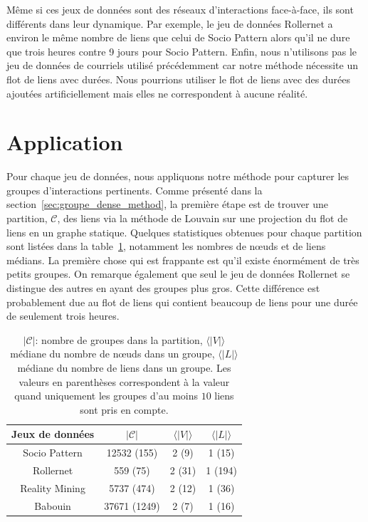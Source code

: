 Même si ces jeux de données sont des réseaux d'interactions face-à-face, ils sont différents dans leur dynamique.
Par exemple, le jeu de données Rollernet a environ le même nombre de liens que celui de Socio Pattern alors qu'il ne dure que trois heures contre 9 jours pour Socio Pattern.
Enfin, nous n'utilisons pas le jeu de données de courriels utilisé précédemment car notre méthode nécessite un flot de liens avec durées.
Nous pourrions utiliser le flot de liens avec des durées ajoutées artificiellement mais elles ne correspondent à aucune réalité.



\section{Application}
\label{sec:groupe_dense_result}

Pour chaque jeu de données, nous appliquons notre méthode pour capturer les groupes d'interactions pertinents.
Comme présenté dans la section~\ref{sec:groupe_dense_method}, la première étape est de trouver une partition, $\mathcal{C}$, des liens via la méthode de Louvain sur une projection du flot de liens en un graphe statique.
Quelques statistiques obtenues pour chaque partition sont listées dans la table~\ref{tab:partition_spec_gd}, notamment les nombres de n\oe{}uds et de liens médians.
La première chose qui est frappante est qu'il existe énormément de très petits groupes.
On remarque également que seul le jeu de données Rollernet se distingue des autres en ayant des groupes plus gros.
Cette différence est probablement due au flot de liens qui contient beaucoup de liens pour une durée de seulement trois heures.

\begin{table}
\centering
\begin{tabular}{|c|c|c|c|}
\hline \rule[-1ex]{0pt}{3.5ex}
Jeux de données & $|\mathcal{C}|$ & $\langle|V|\rangle$  & $\langle|L|\rangle$ \\
\hline
Socio Pattern & 12532 (155) & 2 (9) & 1 (15) \\
Rollernet& 559 (75) & 2 (31) & 1 (194) \\
Reality Mining & 5737 (474) & 2 (12) & 1 (36) \\
Babouin & 37671 (1249)  &  2 (7)  & 1 (16) \\
\hline
\end{tabular}
\caption{$|\mathcal{C}|$: nombre de groupes dans la partition, $\langle|V|\rangle$ médiane du nombre de n\oe{}uds dans un groupe, $\langle|L|\rangle$ médiane du nombre de liens dans un groupe.
Les valeurs en parenthèses correspondent à la valeur quand uniquement les groupes d'au moins $10$ liens sont pris en compte.}
\label{tab:partition_spec_gd}       %
\end{table}


